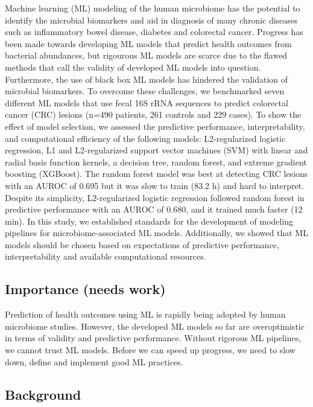 \documentclass[11pt,]{article}
\begin{document}
Machine learning (ML) modeling of the human microbiome has the potential
to identify the microbial biomarkers and aid in diagnosis of many
chronic diseases such as inflammatory bowel disease, diabetes and
colorectal cancer. Progress has been made towards developing ML models
that predict health outcomes from bacterial abundances, but rigourous ML
models are scarce due to the flawed methods that call the validity of
developed ML models into question. Furthermore, the use of black box ML
models has hindered the validation of microbial biomarkers. To overcome
these challenges, we benchmarked seven different ML models that use
fecal 16S rRNA sequences to predict colorectal cancer (CRC) lesions
(n=490 patients, 261 controls and 229 cases). To show the effect of
model selection, we assessed the predictive performance,
interpretability, and computational efficiency of the following models:
L2-regularized logistic regression, L1 and L2-regularized support vector
machines (SVM) with linear and radial basis function kernels, a decision
tree, random forest, and extreme gradient boosting (XGBoost). The random
forest model was best at detecting CRC lesions with an AUROC of 0.695
but it was slow to train (83.2 h) and hard to interpret. Despite its
simplicity, L2-regularized logistic regression followed random forest in
predictive performance with an AUROC of 0.680, and it trained much
faster (12 min). In this study, we established standards for the
development of modeling pipelines for microbiome-associated ML models.
Additionally, we showed that ML models should be chosen based on
expectations of predictive performance, interpretability and available
computational resources.

\newpage

\subsection{Importance (needs work)}\label{importance-needs-work}

Prediction of health outcomes using ML is rapidly being adopted by human
microbiome studies. However, the developed ML models so far are
overoptimistic in terms of validity and predictive performance. Without
rigorous ML pipelines, we cannot trust ML models. Before we can speed up
progress, we need to slow down, define and implement good ML practices.
\newpage

\subsection{Background}\label{background}
\end{document}

